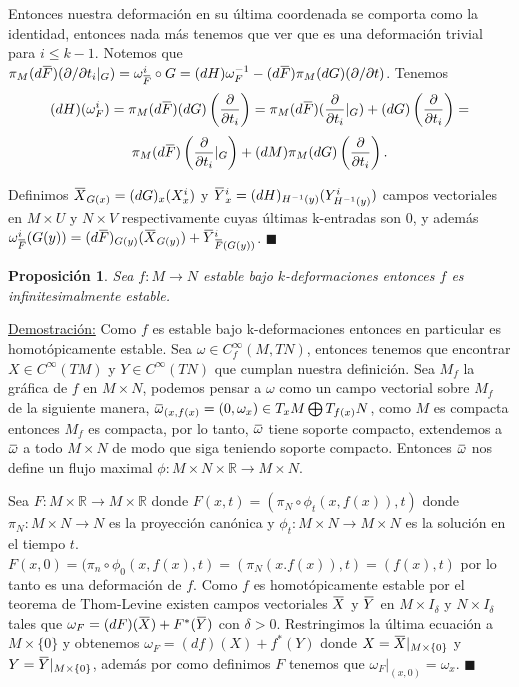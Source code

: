 \documentclass{report}
\newtheorem{prop}[theorem]{Proposici\'on}
\theoremstyle{definition}
\newcommand{\overbar}[1]{\mkern 1.5mu\overline{\mkern-1.5mu#1\mkern-1.5mu}\mkern 1.5mu}
\begin{document}
Entonces nuestra deformaci\'on en su \'ultima coordenada se comporta como la identidad, entonces nada m\'as tenemos que ver que es una deformaci\'on trivial para $i \leq k-1$. Notemos que $\pi_M (d \overbar{F} )(\partial / \partial t_i \vert_G)   = \omega_{\overbar{F}}^{i} \circ G = (dH) \omega_F^{-1} - (d \overbar{F}) \pi_M (dG)(\partial / \partial t )$. Tenemos
$$ (dH)(\omega_F^{i}) = \pi_M (d \overbar{F})(dG) \left( \frac{\partial}{\partial t_i} \right) = \pi_M (d \overbar{F}) (\frac{\partial}{\partial t_i} \vert_G) + (dG) \left( \frac{\partial}{\partial t_i} \right) =$$ $$\pi_M (d \overbar{F}) \left( \frac{\partial}{\partial t_i} \vert_G \right) + (dM) \pi_M (dG) \left( \frac{\partial}{\partial t_i} \right) .$$ 

Definimos $\overbar{X}_{G(x)} = (dG)_x (X^{i}_x)$ y $\overbar{Y}^{i}_x = (dH)_{H^{-1}(y)} (Y^{i}_{H^{-1}(y)})$ campos vectoriales en $M \times U$ y $N \times V$ respectivamente cuyas \'ultimas k-entradas son $0$, y adem\'as $\omega_{\overbar{F}}^{i} (G(y))= (d \overbar{F})_{G(y)} (\overbar{X}_{G(y)}) + \overbar{Y}^{i}_{\overbar{F} (G(y))}$. $\blacksquare$

\begin{prop}
Sea $f: M \to N$ estable bajo $k$-deformaciones entonces $f$ es infinitesimalmente estable.
\end{prop}

\underline{Demostraci\'on:} Como $f$ es estable bajo k-deformaciones entonces en particular es homot\'opicamente estable. Sea $\omega \in C^\infty_f (M , TN)$, entonces tenemos que encontrar $X \in C^\infty (TM)$ y $Y \in C^\infty(TN)$ que cumplan nuestra definici\'on. Sea $M_f$ la gr\'afica de $f$ en $M \times N$, podemos pensar a $\omega$ como un campo vectorial sobre $M_f$ de la siguiente manera, $\overbar{\omega}_{(x,f(x)} = (0, \omega_x) \in T_x M \bigoplus T_{f(x)} N$, como $M$ es compacta entonces $M_f$ es compacta, por lo tanto, $\overbar{\omega}$ tiene soporte compacto, extendemos a $\overbar{\omega}$ a todo $M \times N$ de modo que siga teniendo soporte compacto. Entonces $\overbar{\omega}$ nos define un flujo maximal $\phi: M \times N \times \mathbb{R} \to M \times N$.

Sea $F: M \times \mathbb{R} \to M \times \mathbb{R}$ donde $F(x,t)= (\pi_N \circ \phi_t (x , f(x)), t)$ donde $\pi_N : M \times N \to N$ es la proyecci\'on can\'onica y $\phi_t: M \times N \to M \times N$ es la soluci\'on en el tiempo $t$. $F(x,0)= (\pi_n \circ \phi_0 (x, f(x) , t) = (\pi_N (x. f(x)) , t) = (f(x),t)$ por lo tanto es una deformaci\'on de $f$. Como $f$ es homot\'opicamente estable por el teorema de Thom-Levine existen campos vectoriales $\overbar{X}$ y $\overbar{Y}$ en $M \times I_\delta$ y $N \times I_\delta$ tales que $\omega_F = (dF)(\overbar{X}) + F^\ast (\overbar{Y})$ con $\delta >0$. Restringimos la \'ultima ecuaci\'on a $M \times \{ 0 \}$ y obtenemos $\omega_F = (df)(X) + f^\ast (Y)$ donde $X= \overbar{X} \vert_{M \times \{ 0 \}}$ y $Y= \overbar{Y} \vert_{M \times  \{0 \}}$, adem\'as por como definimos $F$ tenemos que $\omega_F \vert_{(x,0)} = \omega_x$. $\blacksquare$
\end{document}
